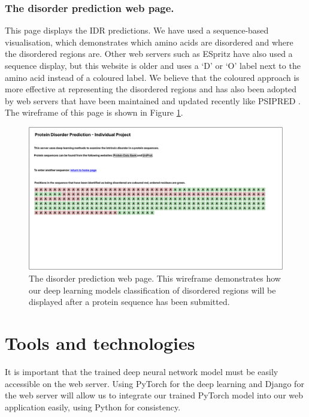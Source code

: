 \documentclass{l4proj}
\begin{document}
\subsubsection{The disorder prediction web page.}

This page displays the IDR predictions. We have used a sequence-based visualisation, which demonstrates which amino acids are disordered and where the disordered regions are. Other web servers such as ESpritz \citep{Walsh:11} have also used a sequence display, but this website is older and uses a ‘D’ or ‘O’ label next to the amino acid instead of a coloured label. We believe that the coloured approach is more effective at representing the disordered regions and has also been adopted by web servers that have been maintained and updated recently like PSIPRED \citep{Jones:19}. The wireframe of this page is shown in Figure \ref{fig:wireframe2}.

\begin{figure}[!htb]
    \centering
    \includegraphics[width=\linewidth]{images/Index-disorderprediction.pdf}
    
    \caption{The disorder prediction web page. This wireframe demonstrates how our deep learning models classification of disordered regions will be displayed after a protein sequence has been submitted.}
    
    \label{fig:wireframe2} 
\end{figure}

\section{Tools and technologies}
It is important that the trained deep neural network model must be easily accessible on the web server. Using PyTorch for the deep learning and Django for the web server will allow us to integrate our trained PyTorch model into our web application easily, using Python for consistency.
\end{document}
